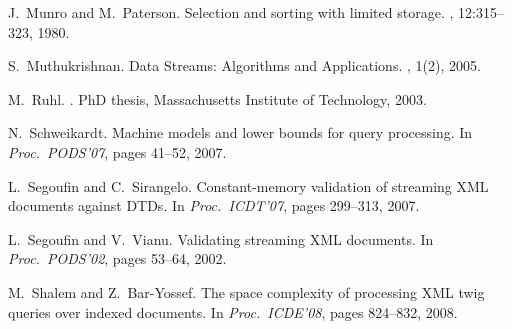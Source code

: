 \documentclass[proceedings]{stacs}
\theoremstyle{plain}\newtheorem{satz}[thm]{Satz}
\theoremstyle{definition}\newtheorem{crucial}[thm]{Crucial Definition}
\begin{document}
\begin{thebibliography}{10}
J.~Munro and M.~Paterson.
\newblock Selection and sorting with limited storage.
, 12:315--323, 1980.

S.~Muthukrishnan.
\newblock Data {S}treams: {A}lgorithms and {A}pplications.
, 1(2),
  2005.

M.~Ruhl.
.
\newblock PhD thesis, Massachusetts Institute of Technology, 2003.

N.~Schweikardt.
\newblock Machine models and lower bounds for query processing.
\newblock In {\em Proc.\ PODS'07}, pages 41--52, 2007.

L.~Segoufin and C.~Sirangelo.
\newblock Constant-memory validation of streaming {XML} documents against
  {DTDs}.
\newblock In {\em Proc.\ ICDT'07}, pages 299--313, 2007.

L.~Segoufin and V.~Vianu.
\newblock Validating streaming {XML} documents.
\newblock In {\em Proc.\ PODS'02}, pages 53--64, 2002.

M.~Shalem and Z.~Bar-Yossef.
\newblock The space complexity of processing {XML} twig queries over indexed
  documents.
\newblock In {\em Proc.\ ICDE'08}, pages 824--832, 2008.

\newpage
\phantom{.}
\end{thebibliography}
\end{document}
